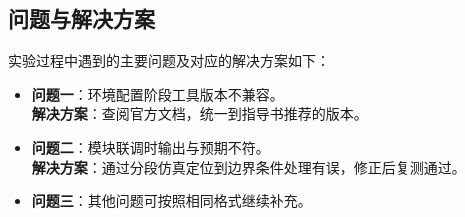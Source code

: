 \subsection{问题与解决方案}

实验过程中遇到的主要问题及对应的解决方案如下：

\begin{itemize}
    \item \textbf{问题一}：环境配置阶段工具版本不兼容。\\
          \textbf{解决方案}：查阅官方文档，统一到指导书推荐的版本。
    \item \textbf{问题二}：模块联调时输出与预期不符。\\
          \textbf{解决方案}：通过分段仿真定位到边界条件处理有误，修正后复测通过。
    \item \textbf{问题三}：其他问题可按照相同格式继续补充。
\end{itemize}